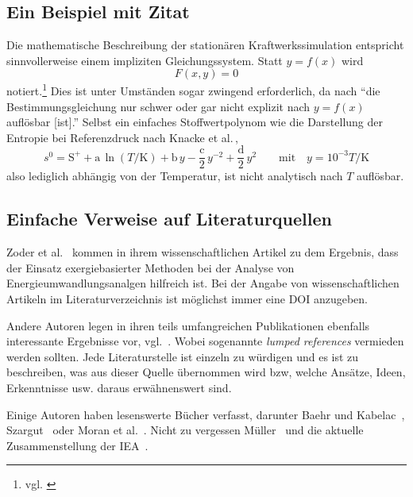 \subsection{Ein Beispiel mit Zitat}

Die mathematische Beschreibung der stationären Kraftwerkssimulation entspricht sinnvollerweise einem impliziten Gleichungssystem. Statt $y=f(x)$ wird 
\begin{equation}
F\left(x, y\right)=0
\end{equation}
notiert.\footnote{vgl. \cite[S.\,147]{papula2014}} Dies ist unter Umständen sogar zwingend erforderlich, da nach \cite[S.\,260]{westermann2011} "`die Bestimmungsgleichung nur schwer oder gar nicht explizit nach $y=f(x)$ auflösbar [ist]."' Selbst ein einfaches Stoffwertpolynom wie die Darstellung der Entropie bei Referenzdruck nach Knacke et al.\,\cite{knacke1991}, 
\begin{equation}
s^0=\text{S}^++\text{a}\,\ln(T/\text{K})+\text{b}\,y-\frac{\text{c}}{2}\,y^{-2}+\frac{\text{d}}{2}\,y^2\quad\quad\text{mit}\quad y=10^{-3}T/\text{K}
\label{eq:knacke_entropie}
\end{equation}
also lediglich abhängig von der Temperatur, ist nicht analytisch nach $T$ auflösbar.

\subsection{Einfache Verweise auf Literaturquellen}

Zoder et al.~\cite{zoder2018} kommen in ihrem wissenschaftlichen Artikel zu dem Ergebnis, dass der Einsatz exergiebasierter Methoden bei der Analyse von Energieumwandlungsanalgen hilfreich ist. Bei der Angabe von wissenschaftlichen Artikeln im Literaturverzeichnis ist möglichst immer eine DOI anzugeben.

Andere Autoren legen in ihren teils umfangreichen Publikationen ebenfalls interessante Ergebnisse vor, vgl.~\cite{baehr1979,clausius1850,gasparovic1969,keenan1932,lojewski_urban1989}. Wobei sogenannte \textit{lumped references} vermieden werden sollten. Jede Literaturstelle ist einzeln zu würdigen und es ist zu beschreiben, was aus dieser Quelle übernommen wird bzw, welche Ansätze, Ideen, Erkenntnisse usw. daraus erwähnenswert sind.

Einige Autoren haben lesenswerte Bücher verfasst, darunter Baehr und Kabelac~\cite{baehr2012}, Szargut~\cite{szargut2007} oder Moran et al.~\cite{moran2014}. Nicht zu vergessen Müller~\cite{mueller2001} und die aktuelle Zusammenstellung der IEA~\cite{weo2016}.

